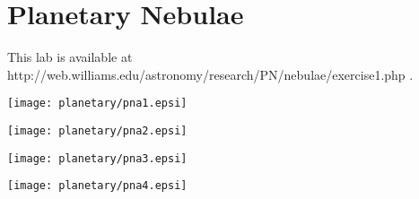 \chapter{Planetary Nebulae}

This lab is available at http://web.williams.edu/astronomy/research/PN/nebulae/exercise1.php .


\texttt{[image: planetary/pna1.epsi]}

\texttt{[image: planetary/pna2.epsi]}

\texttt{[image: planetary/pna3.epsi]}

\texttt{[image: planetary/pna4.epsi]}

